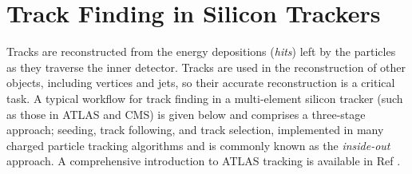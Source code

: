 



\section{Track Finding in Silicon Trackers}
\label{track-finding-silicon-trackers}



Tracks are reconstructed from the energy depositions (\textit{hits}) left by the particles as they traverse the inner detector. Tracks are used in the reconstruction of other objects, including vertices and jets, so their accurate reconstruction is a critical task. A typical workflow for track finding in a multi-element silicon tracker (such as those in ATLAS and CMS) is given below and comprises a three-stage approach; seeding, track following, and track selection, implemented in many charged particle tracking algorithms and is commonly known as the \textit{inside-out} approach. A comprehensive introduction to ATLAS tracking is available in Ref \cite{Cornelissen:2007vba}.



